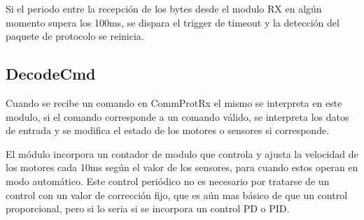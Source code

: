 \documentclass[12pt]{article}
\begin{document}
Si el periodo entre la recepción de los bytes desde el modulo RX en algún momento supera los 100ms, se dispara el trigger de timeout y la detección del paquete de protocolo se reinicia.

\subsection{DecodeCmd}
Cuando se recibe un comando en CommProtRx el mismo se interpreta en este modulo, si el comando corresponde a un comando válido, se interpreta los datos de entrada y se modifica el estado de los motores o sensores si corresponde.

El módulo incorpora un contador de modulo que controla y ajusta la velocidad de los motores cada 10ms según el valor de los sensores, para cuando estos operan en modo automático. Este control periódico no es necesario por tratarse de un control con un valor de corrección fijo, que es aún mas básico de que un control proporcional, pero si lo seria si se incorpora un control PD o PID.
\end{document}
